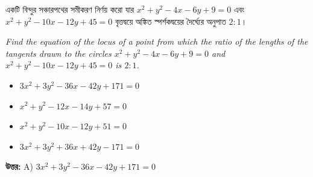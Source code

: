 \documentclass[12pt, a4paper]{article}
\begin{document}
\vspace{2em}

\begin{tcolorbox}[questionbox={প্রশ্ন (Question) 33}]
    \noindent
    একটি বিন্দুর সঞ্চারপথের সমীকরণ নির্ণয় করো যার $x^2 + y^2 - 4x - 6y + 9 = 0$ এবং $x^2 + y^2 - 10x - 12y + 45 = 0$ বৃত্তদ্বয়ে অঙ্কিত স্পর্শকদ্বয়ের দৈর্ঘ্যের অনুপাত $2 : 1$।
    
    \vspace{0.8em}
    \begin{english}
    \noindent\textit{\color{darkgray}
    Find the equation of the locus of a point from which the ratio of the lengths of the tangents drawn to the circles $x^2 + y^2 - 4x - 6y + 9 = 0$ and $x^2 + y^2 - 10x - 12y + 45 = 0$ is $2 : 1$.
    }
    \end{english}
\end{tcolorbox}

\begin{itemize}[label={}, leftmargin=1cm, itemsep=0.5em]
    \item[\textbf{A)}] $3x^2 + 3y^2 - 36x - 42y + 171 = 0$
    \item[\textbf{B)}] $x^2 + y^2 - 12x - 14y + 57 = 0$
    \item[\textbf{C)}] $x^2 + y^2 - 10x - 12y + 51 = 0$
    \item[\textbf{D)}] $3x^2 + 3y^2 + 36x + 42y - 171 = 0$
\end{itemize}

\vspace{0.5em}
\begin{tcolorbox}[answerbox]
    \textbf{\color{success} উত্তর:} A) $3x^2 + 3y^2 - 36x - 42y + 171 = 0$
\end{tcolorbox}
\vspace{1em}
\end{document}
